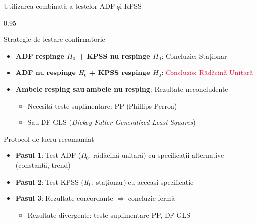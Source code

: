 \documentclass[9pt, aspectratio=169, t]{beamer}
\begin{document}
\begin{frame}{Utilizarea combinată a testelor ADF și KPSS}
    \begin{cminipage}{0.95\textwidth}
        \begin{block}{Strategie de testare confirmatorie}
            \begin{itemize}\setlength{\itemsep}{0pt}
                \item \textbf{ADF respinge $H_0$ + KPSS nu respinge $H_0$}: \textcolor{Forest}{Concluzie: Staționar}
                \item \textbf{ADF nu respinge $H_0$ + KPSS respinge $H_0$}: \textcolor{Crimson}{Concluzie: Rădăcină Unitară}
                \item \textbf{Ambele resping sau ambele nu resping}: Rezultate neconcludente
                \begin{itemize}
                    \item Necesită teste suplimentare: PP (Phillips-Perron)
                    \item Sau DF-GLS (\textit{Dickey-Fuller Generalized Least Squares})
                \end{itemize}
            \end{itemize}
        \end{block}

        \vspace{0.1cm}

        \begin{exampleblock}{Protocol de lucru recomandat}
            \begin{itemize}\setlength{\itemsep}{0pt}
                \item \textbf{Pasul 1}: Test ADF ($H_0$: rădăcină unitară) cu specificații alternative (constantă, trend)
                \item \textbf{Pasul 2}: Test KPSS ($H_0$: staționar) cu aceeași specificație
                \item \textbf{Pasul 3}: Rezultate concordante $\Rightarrow$ concluzie fermă
                \begin{itemize}
                    \item Rezultate divergente: teste suplimentare PP, DF-GLS
                \end{itemize}
            \end{itemize}
        \end{exampleblock}
    \end{cminipage}
\end{frame}
\end{document}
